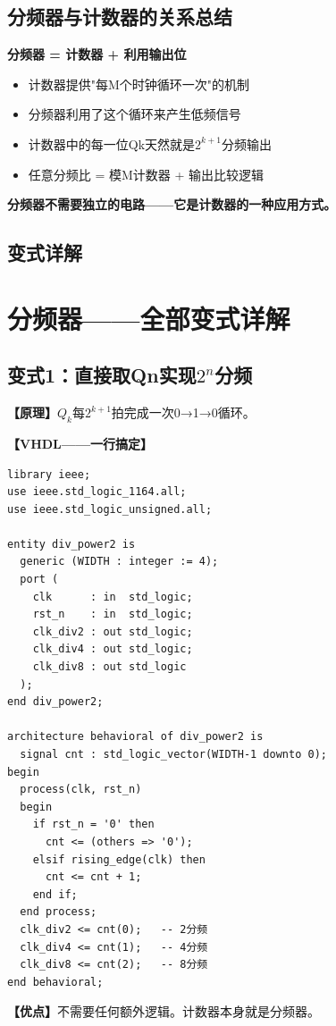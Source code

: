 \section{分频器与计数器的关系总结}

\begin{keypoint}[核心关系]
\textbf{分频器 = 计数器 + 利用输出位}

\begin{itemize}
  \item 计数器提供"每M个时钟循环一次"的机制
  \item 分频器利用了这个循环来产生低频信号
  \item 计数器中的每一位Qk天然就是$2^{k+1}$分频输出
  \item 任意分频比 = 模M计数器 + 输出比较逻辑
\end{itemize}

\textbf{分频器不需要独立的电路——它是计数器的一种应用方式。}
\end{keypoint}

\section{变式详解}
\chapter{分频器——全部变式详解}

\section{变式1：直接取Qn实现$2^n$分频}

\begin{detailbox}[完整教学]
\textbf{【原理】}$Q_k$每$2^{k+1}$拍完成一次0→1→0循环。

\textbf{【VHDL——一行搞定】}
\begin{lstlisting}
library ieee;
use ieee.std_logic_1164.all;
use ieee.std_logic_unsigned.all;

entity div_power2 is
  generic (WIDTH : integer := 4);
  port (
    clk      : in  std_logic;
    rst_n    : in  std_logic;
    clk_div2 : out std_logic;
    clk_div4 : out std_logic;
    clk_div8 : out std_logic
  );
end div_power2;

architecture behavioral of div_power2 is
  signal cnt : std_logic_vector(WIDTH-1 downto 0);
begin
  process(clk, rst_n)
  begin
    if rst_n = '0' then
      cnt <= (others => '0');
    elsif rising_edge(clk) then
      cnt <= cnt + 1;
    end if;
  end process;
  clk_div2 <= cnt(0);   -- 2分频
  clk_div4 <= cnt(1);   -- 4分频
  clk_div8 <= cnt(2);   -- 8分频
end behavioral;
\end{lstlisting}

\textbf{【优点】}不需要任何额外逻辑。计数器本身就是分频器。
\end{detailbox}


